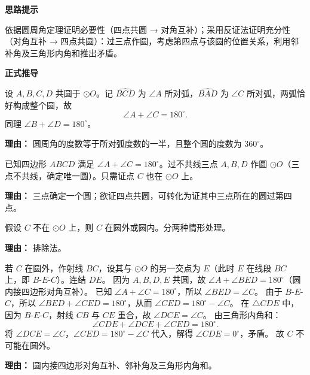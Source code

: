 \begin{proofbox}
	\textbf{\textcolor{CProof}{思路提示}}

	依据圆周角定理证明必要性（四点共圆 → 对角互补）；采用反证法证明充分性（对角互补 → 四点共圆）：过三点作圆，考虑第四点与该圆的位置关系，利用邻补角及三角形内角和推出矛盾。

	\medskip
	\textbf{\textcolor{CProof}{正式推导}}
	\begin{description}[style=nextline, leftmargin=2.8em, labelsep=0.5em, itemsep=0.55em]
		\item[\textbf{步骤一（圆周角证必要性）：}]
			设 $A,B,C,D$ 共圆于 $\odot O$。记 $\widehat{BCD}$ 为 $\angle A$ 所对弧，$\widehat{BAD}$ 为 $\angle C$ 所对弧，两弧恰好构成整个圆，故
			\[
				\angle A + \angle C = 180^\circ.
			\]
			同理 $\angle B + \angle D = 180^\circ$。
			\par\textbf{理由：} 圆周角的度数等于所对弧度数的一半，且整个圆的度数为 $360^\circ$。

		\item[\textbf{步骤二（构造假设）：}]
			已知四边形 $ABCD$ 满足 $\angle A + \angle C = 180^\circ$。过不共线三点 $A,B,D$ 作圆 $\odot O$（三点不共线，确定唯一圆）。只需证点 $C$ 也在 $\odot O$ 上。
			\par\textbf{理由：} 三点确定一个圆；欲证四点共圆，可转化为证其中三点所在的圆过第四点。

		\item[\textbf{步骤三（反设并讨论位置）：}]
			假设 $C$ 不在 $\odot O$ 上，则 $C$ 在圆外或圆内。分两种情形处理。
			\par\textbf{理由：} 排除法。

		\item[\textbf{步骤四（$C$ 在圆外引出矛盾）：}]
			若 $C$ 在圆外，作射线 $BC$，设其与 $\odot O$ 的另一交点为 $E$（此时 $E$ 在线段 $BC$ 上，即 $B$-$E$-$C$）。连结 $DE$。
			因为 $A,B,D,E$ 共圆，故 $\angle A + \angle BED = 180^\circ$（圆内接四边形对角互补）。
			已知 $\angle A + \angle C = 180^\circ$，所以 $\angle BED = \angle C$。
			由于 $B$-$E$-$C$，所以 $\angle BED + \angle CED = 180^\circ$，从而 $\angle CED = 180^\circ - \angle C$。
			在 $\triangle CDE$ 中，因为 $B$-$E$-$C$，射线 $CB$ 与 $CE$ 重合，故 $\angle DCE = \angle C$。
			由三角形内角和：
			\[
				\angle CDE + \angle DCE + \angle CED = 180^\circ.
			\]
			将 $\angle DCE = \angle C$，$\angle CED = 180^\circ - \angle C$ 代入，解得 $\angle CDE = 0^\circ$，矛盾。
			故 $C$ 不可能在圆外。
			\par\textbf{理由：} 圆内接四边形对角互补、邻补角及三角形内角和。


\end{description}
\end{proofbox}
